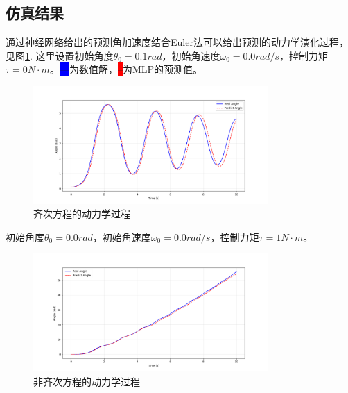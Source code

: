 \documentclass[12pt, AutoFakeBold=4]{ctexart}
\begin{document}
\subsection{仿真结果}
通过神经网络给出的预测角加速度结合Euler法可以给出预测的动力学演化过程，见图\ref{图：动力学}.
这里设置初始角度$\theta_0=0.1 rad$，初始角速度$\omega_0=0.0rad/s$，控制力矩$\tau=0N\cdot m$。\colorbox{blue}{—}为数值解，\colorbox{red}{--}为MLP的预测值。
\begin{figure}[htpb]
    \centering
    \includegraphics[width=0.8\textwidth]{evolutionary.png}
    \caption{齐次方程的动力学过程}
    \label{图：动力学}
\end{figure}
\par
初始角度$\theta_0=0.0 rad$，初始角速度$\omega_0=0.0rad/s$，控制力矩$\tau=1N\cdot m$。
\begin{figure}[htpb]
	\centering
	\includegraphics[width=0.8\textwidth]{evolut.png}
	\caption{非齐次方程的动力学过程}
	\label{图：动力学2}
\end{figure}
\end{document}
